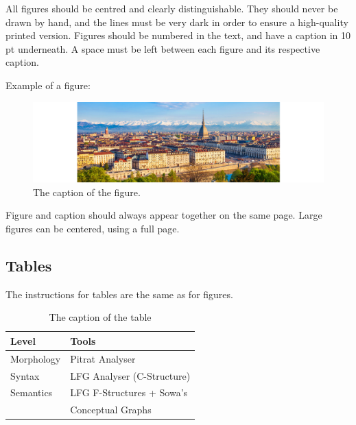 \documentclass[10pt, a4paper]{article}
\begin{document}
All figures should be centred and clearly distinguishable. They should never be drawn by hand, and the lines must be very dark in order to ensure a high-quality printed version. Figures should be numbered in the text, and have a caption in  10 pt underneath. A space must be left between each figure and its respective caption. 

Example of a figure:

\begin{figure}[!ht]
\begin{center}
\includegraphics[scale=0.5]{turin2024-banner.jpg} 
\caption{The caption of the figure.}
\label{fig.1}
\end{center}
\end{figure}

Figure and caption should always appear together on the same page. Large figures can be centered, using a full page.

\subsection{Tables}

The instructions for tables are the same as for figures.

\begin{table}[!ht]
\begin{center}
\begin{tabularx}{\columnwidth}{|l|X|}

      \hline
      Level&Tools\\
      \hline
      Morphology & Pitrat Analyser\\
      \hline
      Syntax & LFG Analyser (C-Structure)\\
      \hline
     Semantics & LFG F-Structures + Sowa's\\
     & Conceptual Graphs\\
      \hline

\end{tabularx}
\caption{The caption of the table}
 \end{center}
\end{table}
\end{document}
